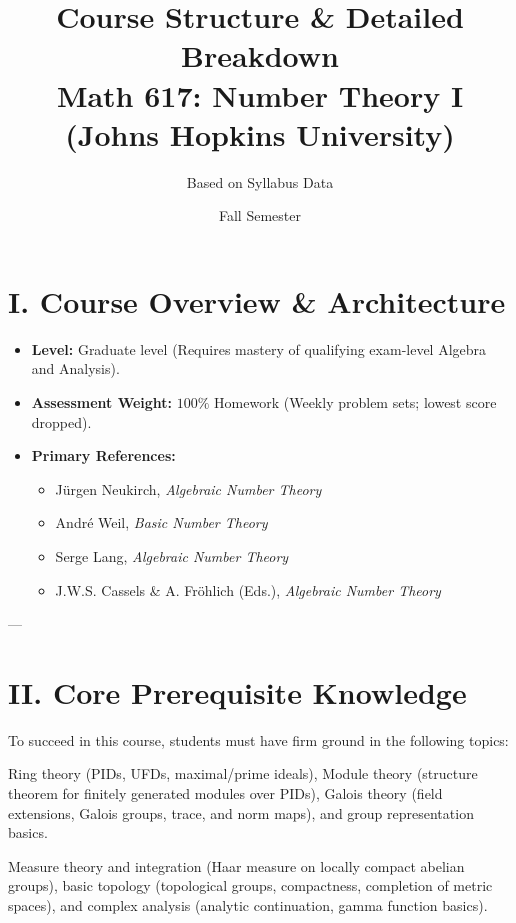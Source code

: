 \documentclass[11pt]{article}
\title{\textbf{Course Structure \& Detailed Breakdown}\\ \large Math 617: Number Theory I (Johns Hopkins University)}
\author{Based on Syllabus Data}
\date{Fall Semester}
\begin{document}
\maketitle

\section*{I. Course Overview \& Architecture}

\begin{itemize}[leftmargin=*]
    \item \textbf{Level:} Graduate level (Requires mastery of qualifying exam-level Algebra and Analysis).
    \item \textbf{Assessment Weight:} $100\%$ Homework (Weekly problem sets; lowest score dropped).
    \item \textbf{Primary References:} 
        \begin{itemize}
            \item Jürgen Neukirch, \emph{Algebraic Number Theory}
            \item André Weil, \emph{Basic Number Theory}
            \item Serge Lang, \emph{Algebraic Number Theory}
            \item J.W.S. Cassels \& A. Fröhlich (Eds.), \emph{Algebraic Number Theory}
        \end{itemize}
\end{itemize}

---

\section*{II. Core Prerequisite Knowledge}

To succeed in this course, students must have firm ground in the following topics:

\begin{description}[leftmargin=*]
    \item[Graduate Algebra:] Ring theory (PIDs, UFDs, maximal/prime ideals), Module theory (structure theorem for finitely generated modules over PIDs), Galois theory (field extensions, Galois groups, trace, and norm maps), and group representation basics.
    \item[Graduate Analysis:] Measure theory and integration (Haar measure on locally compact abelian groups), basic topology (topological groups, compactness, completion of metric spaces), and complex analysis (analytic continuation, gamma function basics).
\end{description}
\end{document}
